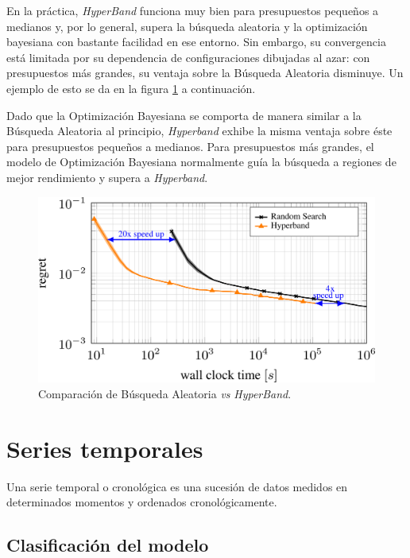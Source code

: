 \documentclass[a4paper,12pt]{article}
\begin{document}
En la práctica, \textit{HyperBand} funciona muy bien para presupuestos pequeños a medianos y, por lo general, supera la búsqueda aleatoria y la optimización bayesiana con bastante facilidad en ese entorno. Sin embargo, su convergencia está limitada por su dependencia de configuraciones dibujadas al azar: con presupuestos más grandes, su ventaja sobre la Búsqueda Aleatoria disminuye. Un ejemplo de esto se da en la figura \ref{fig:rs_vs_hb} a continuación. \citep{automl-bohb}

Dado que la Optimización Bayesiana se comporta de manera similar a la Búsqueda Aleatoria al principio, \textit{Hyperband} exhibe la misma ventaja sobre éste para presupuestos pequeños a medianos. Para presupuestos más grandes, el modelo de Optimización Bayesiana normalmente guía la búsqueda a regiones de mejor rendimiento y supera a \textit{Hyperband}.

\begin{figure}[H]
	\begin{center}
	\includegraphics[width=1\textwidth]{comparison_rs_hb.png}
  	\caption{Comparación de Búsqueda Aleatoria \textit{vs} \textit{HyperBand}.}
  	\label{fig:rs_vs_hb}
  	\end{center}
\end{figure}

\section{Series temporales}

Una serie temporal o cronológica es una sucesión de datos medidos en determinados momentos y ordenados cronológicamente. \citep{Agrawal2019Mar}

\subsection{Clasificación del modelo}
\end{document}
